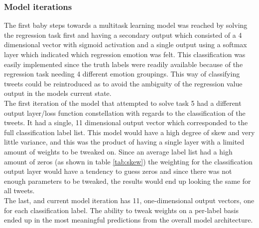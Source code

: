 \subsubsection{Model iterations} \label{sec:iter}
The first baby steps towards a multitask learning model was reached by solving the regression task first and having a secondary output which consisted of a 4 dimensional vector with sigmoid activation and a single output using a softmax layer which indicated which regression emotion was felt. This classification was easily implemented since the truth labels were readily available because of the regression task needing 4 different emotion groupings. This way of classifying tweets could be reintroduced as to avoid the ambiguity of the regression value output in the models current state.\\
The first iteration of the model that attempted to solve task 5 had a different output layer/loss function constellation with regards to the classification of the tweets. It had a single, 11 dimensional output vector which corresponded to the full classification label list. This model would have a high degree of skew and very little variance, and this was the product of having a single layer with a limited amount of weights to be tweaked on. Since an average label list had a high amount of zeros (as shown in table \ref{tab:skew}) the weighting for the classification output layer would have a tendency to guess zeros and since there was not enough parameters to be tweaked, the results would end up looking the same for all tweets.\\
The last, and current model iteration has 11, one-dimensional output vectors, one for each classification label. The ability to tweak weights on a per-label basis ended up in the most meaningful predictions from the overall model architecture.

